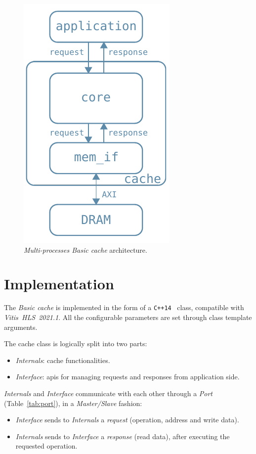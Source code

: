 \documentclass[11pt,a4paper,oneside]{memoir}
\begin{document}
\begin{figure}[!htb]
	\centering
	\includegraphics[width=.3\textwidth]{multi_proc_basic_arch}
	\caption{\emph{Multi-processes Basic cache} architecture.}
	\label{fig:multi_proc_basic_arch}
\end{figure}

\section{Implementation}\label{sec:basic_impl}
The \emph{Basic cache} is implemented in the form of a
\texttt{C++14}~\cite{cpp14} class, compatible with
\emph{Vitis\texttrademark~HLS~2021.1}.
All the configurable parameters are set through class template arguments.

The cache class is logically split into two parts:
\begin{itemize}
	\item \emph{Internals}: cache functionalities.
	\item \emph{Interface}: \acsp{api} for managing requests and responses
		from application side.
\end{itemize}

\emph{Internals} and \emph{Interface} communicate with each other through a
\emph{Port} (Table~\ref{tab:port}), in a \emph{Master/Slave} fashion:
\begin{itemize}
	\item \emph{Interface} sends to \emph{Internals} a \emph{request}
		(operation, address and write data).
	\item \emph{Internals} sends to \emph{Interface} a \emph{response}
		(read data), after executing the requested operation.
\end{itemize}
\end{document}
